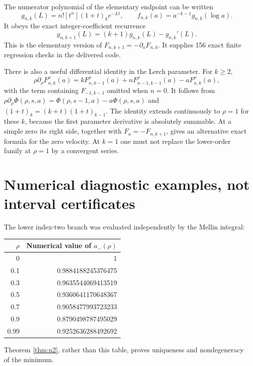 \documentclass[11pt]{article}
\numberwithin{equation}{section}
\theoremstyle{definition}\newtheorem{definition}[theorem]{Definition}
\theoremstyle{remark}\newtheorem{remark}[theorem]{Remark}
\begin{document}
The numerator polynomial of the elementary endpoint can be written
\[
g_{n,k}(L)=n![t^n](1+t)_k e^{-Lt},\qquad
f_{n,k}(a)=a^{-k-1}g_{n,k}(\log a).
\]
It obeys the exact integer-coefficient recurrence
\begin{equation}\label{eq:greg}
g_{n,k+1}(L)=(k+1)g_{n,k}(L)-g_{n,k}'(L).
\end{equation}
This is the elementary version of $F_{n,k+1}=-\partial_aF_{n,k}$. It supplies 156 exact finite regression checks in the delivered code.

There is also a useful differential identity in the Lerch parameter. For $k\geq2$,
\begin{equation}\label{eq:rhodiff}
\rho\partial_\rho F_{n,k}^{\rho}(a)
=kF_{n,k-1}^{\rho}(a)+nF_{n-1,k-1}^{\rho}(a)-aF_{n,k}^{\rho}(a),
\end{equation}
with the term containing $F_{-1,k-1}$ omitted when $n=0$. It follows from
$\rho\partial_\rho\Phi(\rho,s,a)=\Phi(\rho,s-1,a)-a\Phi(\rho,s,a)$ and
$(1+t)_k=(k+t)(1+t)_{k-1}$. The identity extends continuously to $\rho=1$ for these $k$, because the first parameter derivative is absolutely summable. At a simple zero its right side, together with $F_a=-F_{n,k+1}$, gives an alternative exact formula for the zero velocity. At $k=1$ one must not replace the lower-order family at $\rho=1$ by a convergent series.

\clearpage
\section{Numerical diagnostic examples, not interval certificates}\label{app:numerics}
The lower index-two branch was evaluated independently by the Mellin integral:
\begin{center}\small
\begin{tabular}{rr}
\toprule
$\rho$ & Numerical value of $a_-(\rho)$\\
\midrule
0 & 1\\
0.1 & 0.9884188245376475\\
0.3 & 0.9635544069413519\\
0.5 & 0.9360641170648367\\
0.7 & 0.9058477993723233\\
0.9 & 0.8790498787495029\\
0.99 & 0.9252636288492692\\
\bottomrule
\end{tabular}
\end{center}
Theorem \ref{thm:n2}, rather than this table, proves uniqueness and nondegeneracy of the minimum.
\end{document}
